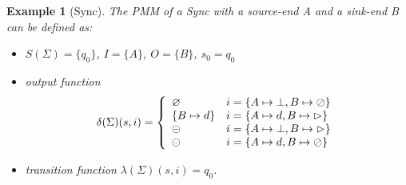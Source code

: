 \documentclass[conference, a4paper]{IEEEtran}
\newtheorem{example}{Example}
\newcommand{\rblock}[0]{\circleddash}
\newcommand{\rread}[0]{\rhd}
\newcommand{\rnoread}[0]{\oslash}
\newcommand{\rempty}[0]{\varnothing}
\begin{document}
\begin{example}[Sync]
  The PMM of a Sync with a source-end A and a sink-end B can be defined as:
  \begin{itemize}
    \item[-] $S(\Sigma)=\{q_0\}$, $I=\{A\}$, $O=\{B\}$, $s_0=q_0$
    \item[-] output function
      \begin{displaymath}
        \delta(\Sigma)(s,i)=\left\{
        \begin{array}[ht]{ll}
          \rempty & i=\{A\mapsto\bot,B\mapsto\rnoread\} \\
          \{B\mapsto d\} & i=\{A\mapsto d,B\mapsto\rread\}\\
          \rblock & i=\{A\mapsto\bot,B\mapsto\rread\} \\
          \rblock & i=\{A\mapsto d,B\mapsto\rnoread\} \\
        \end{array}
        \right.
      \end{displaymath}
    \item[-] transition function $\lambda(\Sigma)(s,i)=q_0$.
  \end{itemize}
\end{example}
\end{document}
